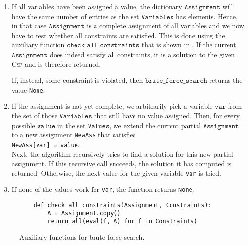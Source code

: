\begin{enumerate}
\item If all variables have been assigned a value, the dictionary $\texttt{Assignment}$ will have the same
      number of entries as the set $\texttt{Variables}$ has elements.  Hence, in that case
      $\texttt{Assignment}$ is a complete assignment of all variables and we now have to test whether
      all constraints are satisfied.  This is done using the auxiliary function
      $\texttt{check\_all\_constraints}$ that is shown in . 
      If the current $\texttt{Assignment}$ does indeed satisfy all constraints, it is a solution to the given
      \textsc{Csp} and is therefore returned.

      If, instead, some constraint is violated, then $\texttt{brute\_force\_search}$ returns the value
      \texttt{None}.
\item If the assignment is not yet complete, we arbitrarily 
      pick a variable $\texttt{var}$ from the set of those $\texttt{Variables}$ that still have no value assigned.  
      Then, for every possible  $\texttt{value}$ in the set $\texttt{Values}$, we extend the current partial
      $\texttt{Assignment}$ to a new assignment \texttt{NewAss} that satisfies
      \\[0.2cm]
      \hspace*{1.3cm}
      \texttt{NewAss[var] = value}.
      \\[0.2cm]
      Next, the algorithm recursively tries to find a solution for this new partial assignment.
      If this recursive call succeeds, the solution it has computed is returned.  Otherwise, the next value
      for the given variable \texttt{var} is tried.
\item If none of the values work for \texttt{var}, the function returns \texttt{None}.
\end{enumerate}


\begin{figure}[!ht]
\centering
\begin{verbatim}
    def check_all_constraints(Assignment, Constraints):
        A = Assignment.copy()
        return all(eval(f, A) for f in Constraints)
\end{verbatim}
\vspace*{-0.3cm}
\caption{Auxiliary functions for brute force search.}
\label{fig:Brute-Force-Solver.ipynb-2}
\end{figure}

